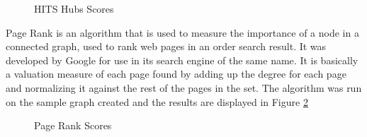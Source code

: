 \begin{figure}[h!]
\centering
{}
\caption{HITS Hubs Scores}
\label{fig:hubs}
\end{figure}

\clearpage

Page Rank is an algorithm that is used to measure the importance of a node in a connected graph, used to rank web pages in an order search result. It was developed by Google for use in its search engine of the same name. It is basically a valuation measure of each page found by adding up the degree for each page and normalizing it against the rest of the pages in the set. The algorithm was run on the sample graph created and the results are displayed in Figure \ref{fig:pagerank}

\begin{figure}[h!]
\centering
{}
\caption{Page Rank Scores}
\label{fig:pagerank}
\end{figure}

